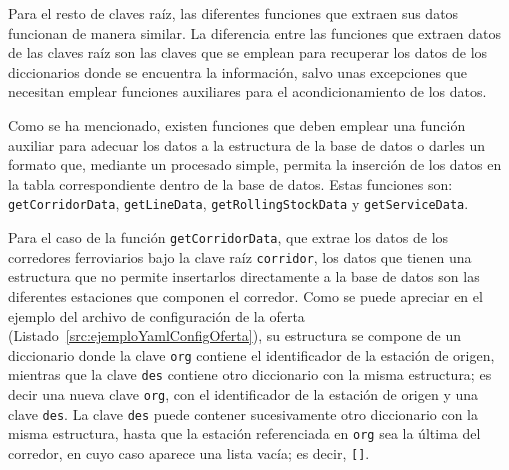 Para el resto de claves raíz, las diferentes funciones que extraen sus datos funcionan de manera similar. La diferencia entre las funciones que extraen datos de las claves raíz son las claves que se emplean para recuperar los datos de los diccionarios donde se encuentra la información, salvo unas excepciones que necesitan emplear funciones auxiliares para el acondicionamiento de los datos.

Como se ha mencionado, existen funciones que deben emplear una función auxiliar para adecuar los datos a la estructura de la base de datos o darles un formato que, mediante un procesado simple, permita la inserción de los datos en la tabla correspondiente dentro de la base de datos. Estas funciones son: \texttt{getCorridorData}, \texttt{getLineData}, \texttt{getRollingStockData} y \texttt{getServiceData}. 

Para el caso de la función \texttt{getCorridorData}, que extrae los datos de los corredores ferroviarios bajo la clave raíz \texttt{corridor}, los datos que tienen una estructura que no permite insertarlos directamente a la base de datos son las diferentes estaciones que componen el corredor. Como se puede apreciar en el ejemplo del archivo de configuración de la oferta (Listado~\ref{src:ejemploYamlConfigOferta}), su estructura se compone de un diccionario donde la clave \texttt{org} contiene el identificador de la estación de origen, mientras que la clave \texttt{des} contiene otro diccionario con la misma estructura; es decir una nueva clave \texttt{org}, con el identificador de la estación de origen y una clave \texttt{des}. La clave \texttt{des} puede contener sucesivamente otro diccionario con la misma estructura, hasta que la estación referenciada en \texttt{org} sea la última del corredor, en cuyo caso aparece una lista vacía; es decir, \texttt{[]}.


